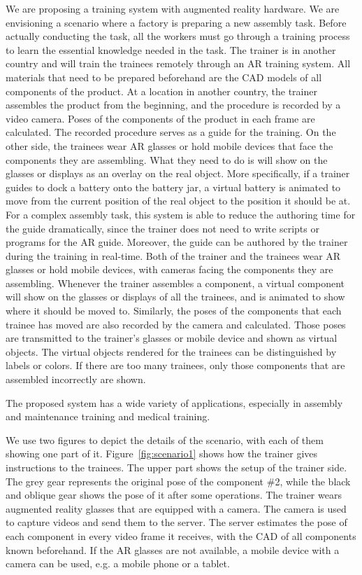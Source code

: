 We are proposing a training system with augmented reality hardware.
We are envisioning a scenario where a factory is preparing a new assembly task.
Before actually conducting the task, all the workers must go through a training process to learn the essential knowledge needed in the task.
The trainer is in another country and will train the trainees remotely through an AR training system.
All materials that need to be prepared beforehand are the CAD models of all components of the product.
At a location in another country, the trainer assembles the product from the beginning, and the procedure is recorded by a video camera. Poses of the components of the product in each frame are calculated. The recorded procedure serves as a guide for the training.
On the other side, the trainees wear AR glasses or hold mobile devices that face the components they are assembling. What they need to do is will show on the glasses or displays as an overlay on the real object. More specifically, if a trainer guides to dock a battery onto the battery jar, a virtual battery is animated to move from the current position of the real object to the position it should be at.
For a complex assembly task, this system is able to reduce the authoring time for the guide dramatically, since the trainer does not need to write scripts or programs for the AR guide.
Moreover, the guide can be authored by the trainer during the training in real-time.
Both of the trainer and the trainees wear AR glasses or hold mobile devices, with cameras facing the components they are assembling.
Whenever the trainer assembles a component, a virtual component will show on the glasses or displays of all the trainees, and is animated to show where it should be moved to.
Similarly, the poses of the components that each trainee has moved are also recorded by the camera and calculated.
Those poses are transmitted to the trainer's glasses or mobile device and shown as virtual objects.
The virtual objects rendered for the trainees can be distinguished by labels or colors. If there are too many trainees, only those components that are assembled incorrectly are shown.

The proposed system has a wide variety of applications, especially in assembly and maintenance training and medical training.

We use two figures to depict the details of the scenario, with each of them showing one part of it.
Figure~\ref{fig:scenario1} shows how the trainer gives instructions to the trainees.
The upper part shows the setup of the trainer side. The grey gear represents the original pose of the component  \#2, while the black and oblique gear shows the pose of it after some operations.
The trainer wears augmented reality glasses that are equipped with a camera. The camera is used to capture videos and send them to the server.
The server estimates the pose of each component in every video frame it receives, with the CAD of all components known beforehand.
If the AR glasses are not available, a mobile device with a camera can be used, e.g. a mobile phone or a tablet.

